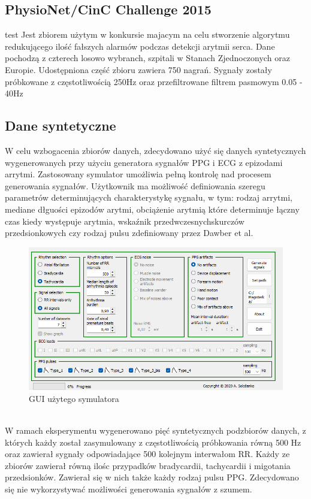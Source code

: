 \documentclass[a4paper,twoside,12pt]{book}
\begin{document}
\subsection{PhysioNet/CinC Challenge 2015}
test\cite{physionet_challenge_2015} Jest zbiorem użytym w konkursie majacym na celu stworzenie algorytmu redukującego ilość fałszych alarmów podczas detekcji arytmii serca. Dane pochodzą z czterech losowo wybranch, szpitali w Stanach Zjednoczonych oraz Europie. Udostępniona część zbioru zawiera 750 nagrań. Sygnały zostały próbkowane z częstotliwością 250Hz oraz przefiltrowane filtrem pasmowym 0.05 - 40Hz
\subsection{Dane syntetyczne}
W celu wzbogacenia zbiorów danych, zdecydowano użyć się danych syntetycznych wygenerowanych przy użyciu generatora sygnałów PPG i ECG z epizodami arrytmi\cite{solosenko2022}. Zastosowany symulator umożliwia pełną kontrolę nad procesem generowania sygnałów. Użytkownik ma możliwość definiowania szeregu parametrów determinujących charakterystykę sygnału, w tym: rodzaj arrytmi, mediane dłguości epizodów arytmi, obciążenie arytmią które determinuje łączny czas kiedy występuje arytmia, wskaźnik przedwczesnychskurczów przedsionkowych czy rodzaj pulsu zdefiniowany przez Dawber et al\cite{dawber1973dicrotic}.
\begin{figure}[!h]
	\centering
	\includegraphics[width=1\textwidth]{img/r4/symulator_GUI.png}
	\caption{GUI użytego symulatora}
	\label{fig:etykieta-rysunku}
\end{figure}\\

W ramach eksperymentu wygenerowano pięć syntetycznych podzbiorów danych, z których każdy został zasymulowany z częstotliwością próbkowania równą 500 Hz oraz zawierał sygnały odpowiadające 500 kolejnym interwałom RR. Każdy ze zbiorów zawierał równą ilośc przypadków bradycardii, tachycardii i migotania przedsionków. Zawierał się w nich także każdy rodzaj pulsu PPG. Zdecydowano się nie wykorzystywać możliwości generowania sygnałów z szumem.
\end{document}
